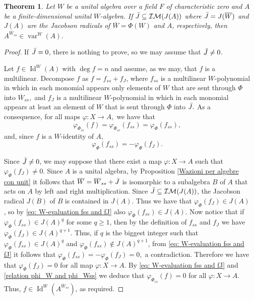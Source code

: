 \documentclass[reqno]{amsart}
\newtheorem{theorem}{Theorem}
\theoremstyle{definition}
\numberwithin{equation}{section}
\numberwithin{theorem}{section}
\DeclareMathOperator{\V}{var}
\DeclareMathOperator{\I}{Id}
\newcommand{\IM}{\mathcal{I}\mathcal{M}}
\begin{document}
\begin{theorem}\label{thm: semisimple action and algebra with 1}
    Let $W$ be a unital algebra over a field $F$ of characteristic zero and $A$ be a finite-dimensional unital 
    $W$-algebra.
     If $\Bar{J}\subseteq \IM(J(A))$ where $\Bar{J}=J(\overline{W})$ and $J(A)$ are the Jacobson radicals of $\overline{W}=\Phi(W)$ and $A$, respectively, then $A^{\overline{W}_{ss}}\in \V^{W}(A).$
\end{theorem}
\begin{proof}
 If $\Bar J=0$, there is nothing to prove, so we may assume that $\Bar J\neq 0$.

     Let $f\in \I^W(A)$  with $\deg f =n$ and assume, as we may, that $f$ is a multilinear. Decompose $f$ as $f=f_{{ss}}+f_{J}$, where $f_{{ss}}$ is a multilinear $W$-polynomial in which in each monomial appears only elements of $W$ that are sent through $\Phi$ into $\overline{W}_{ss},$ and $f_{J}$ is a multilinear $W$-polynomial in which in each monomial appears at least an element of $W$ that is sent through $\Phi$ into $\Bar{J}.$
     As a consequence, for all maps $\varphi:X \rightarrow A,$ we have that
       \begin{equation}\label{relation phi_W and phi_Wss}
        \varphi_{\Phi_{ss}}(f)=\varphi_{\Phi_{ss}}(f_{ss})= \varphi_{\Phi}(f_{ss}),
    \end{equation}
   and, since $f$ is a $W$-identity of $A$,
\begin{equation}\label{eq: W-evaluation fss and fJ}
       \varphi_{\Phi}(f_{ss})=-\varphi_\Phi(f_{J}).
    \end{equation}

Since $\Bar{J}\neq 0$, we may suppose that there exist a map $\varphi:X \rightarrow A$ such that $\varphi_\Phi(f_{J})\neq 0$. 
Since $A$ is a unital algebra, by Proposition \ref{Wazioni per algebre con unit} it follows that $\overline{W}=\overline{W}_{ss}+\Bar{J}$ is isomorphic to a subalgebra $B$ of $A$ that acts on $A$ by left and right multiplication. Since $\Bar{J}\subseteq \IM(J(A))$, the Jacobson radical $J(B)$ of $B$ is contained in $J(A)$. 
Thus we have that $\varphi_\Phi(f_{J})\in J(A)$, so by \eqref{eq: W-evaluation fss and fJ} also $\varphi_{\Phi}(f_{ss})\in J(A)$. Now notice that if $\varphi_{\Phi}(f_{ss})\in J(A)^q$ for some $q\geq 1$, then  by the definition of $f_{ss}$ and $f_J$ we have $\varphi_{\Phi}(f_{J})\in J(A)^{q+1}$. Thus, if $q$ is the biggest integer such that $\varphi_{\Phi}(f_{ss})\in J(A)^q$ and $\varphi_{\Phi}(f_{ss})\notin J(A)^{q+1}$, from \eqref{eq: W-evaluation fss and fJ} it follows that $ \varphi_{\Phi}(f_{ss})=-\varphi_{\Phi}(f_{J})= 0,$ a contradiction. Therefore we have that $\varphi_\Phi(f_{J})=0$ for all map $\varphi:X \rightarrow A.$ By \eqref{eq: W-evaluation fss and fJ} and \eqref{relation phi_W and phi_Wss}  we deduce that $ \varphi_{\Phi_{ss}}(f)=0$ for all $\varphi:X \rightarrow A.$ Thus, $f\in \I^W (A^{\overline{W}_{ss}})$, as required.
\end{proof}
\end{document}
